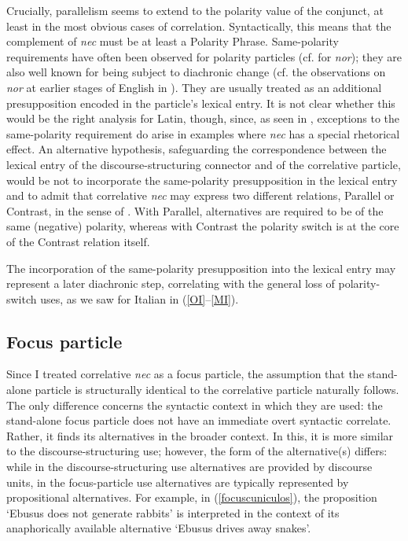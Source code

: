 \documentclass[output=paper,modfonts,nonflat,citecolor=brown,
showindex
]{langsci/langscibook}
\begin{document}
\noindent Crucially, parallelism seems to extend to the polarity value of the conjunct, at least in the most obvious cases of correlation. Syntactically, this means that the complement of {\emph{nec}} must be at least a Polarity Phrase. Same-polarity requirements have often been observed for polarity particles (cf. \citealt[519--520]{Wurmbrand08} for {\emph{nor}}); they are also well known for being subject to diachronic change (cf. the observations on {\emph{nor}} at earlier stages of English in \citealt[114]{Jespersen17}). They are usually treated as an additional presupposition encoded in the particle's lexical entry. It is not clear whether this would be the right analysis for Latin, though, since, as seen in , exceptions to the same-polarity requirement do arise in examples where {\emph{nec}} has a special rhetorical effect. An alternative hypothesis, safeguarding the correspondence between the lexical entry of the discourse-structuring connector and of the correlative particle, would be not to incorporate the same-polarity presupposition in the lexical entry and to admit that correlative {\emph{nec}} may express two different relations, Parallel or Contrast, in the sense of \citet{Asher93}. With Parallel, alternatives are required to be of the same (negative) polarity, whereas with Contrast the polarity switch is at the core of the Contrast relation itself.

The incorporation of the same-polarity presupposition into the lexical entry may represent a later diachronic step, correlating with the general \linebreak loss of polarity-switch uses, as we saw for Italian in (\ref{OI}--\ref{MI}).

\subsection{Focus particle}

Since I treated correlative {\emph{nec}} as a focus particle, the assumption that the stand-alone particle is structurally identical to the correlative particle naturally follows. The only difference concerns the syntactic context in which they are used: the stand-alone focus particle does not have an immediate overt syntactic correlate. Rather, it finds its alternatives in the broader context. In this, it is more similar to the discourse-structuring use; however, the form of the alternative(s) differs: while in the discourse-structuring use alternatives are provided by discourse units, in the focus-particle use alternatives are typically represented by propositional alternatives. For example, in (\ref{focuscuniculos}), the proposition `Ebusus does not generate rabbits' is interpreted in the context of its anaphorically available alternative `Ebusus drives away snakes'.
\end{document}
